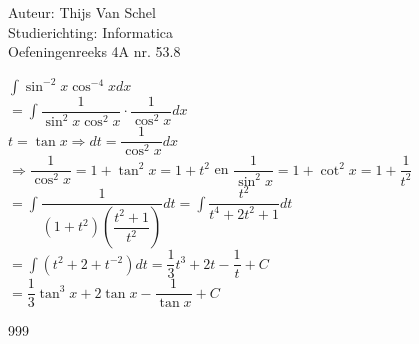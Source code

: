 \documentclass[a4paper]{article}
\newcommand{\dint}{\displaystyle\int}
\begin{document}
  
\noindent \large Auteur: Thijs Van Schel \\
\noindent \large Studierichting: Informatica\\
\noindent \large Oefeningenreeks 4A nr. 53.8\\

\medskip

\normalsize

$\dint \sin^{-2}x\cos^{-4}xdx$\\

$= \dint \dfrac{1}{\sin^2x\cos^2x}\cdot \dfrac{1}{\cos^2x}dx$\\

$t = \tan x \Rightarrow dt = \dfrac{1}{\cos^2x}dx$\\

$\Rightarrow \dfrac{1}{\cos^2x}= 1 + \tan^2x=1+t^2$ en $\dfrac{1}{\sin^2x}=1+\cot^2x=1+\dfrac{1}{t^2}$\\

$=\dint \dfrac{1}{(1+t^2)\left(\dfrac{t^2+1}{t^2}\right)}dt = \dint \dfrac{t^2}{t^4+2t^2+1}dt$\\

$=\dint (t^2+2+t^{-2})dt = \dfrac{1}{3}t^3+2t-\dfrac{1}{t}+C$\\

$= \dfrac{1}{3}\tan^3x+2\tan x - \dfrac{1}{\tan x}+ C$



\begin{thebibliography}{999}
\end{thebibliography}
\end{document}
